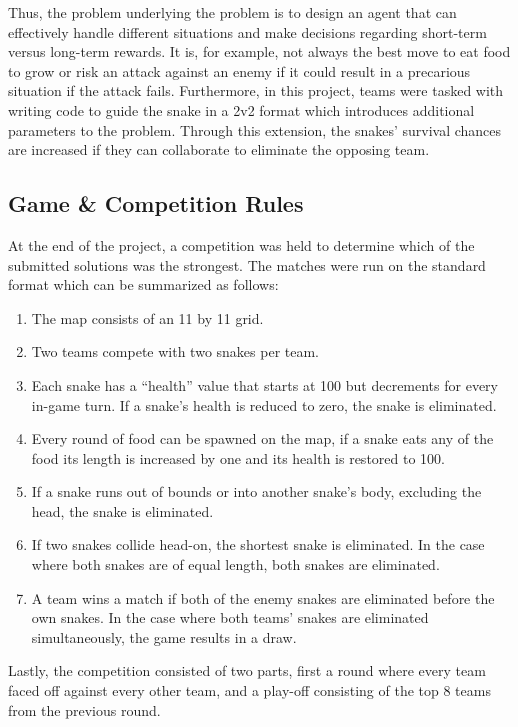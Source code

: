 \documentclass[a4paper,12pt]{article}
\begin{document}
Thus, the problem underlying the problem is to design an agent that can effectively handle different situations and make decisions regarding short-term versus long-term rewards. It is, for example, not always the best move to eat food to grow or risk an attack against an enemy if it could result in a precarious situation if the attack fails. Furthermore, in this project, teams were tasked with writing code to guide the snake in a 2v2 format which introduces additional parameters to the problem. Through this extension, the snakes' survival chances are increased if they can collaborate to eliminate the opposing team.


\subsection{Game \& Competition Rules}
At the end of the project, a competition was held to determine which of the submitted solutions was the strongest. The matches were run on the standard format which can be summarized as follows:

\begin{enumerate}
    \item The map consists of an 11 by 11 grid.
    \item Two teams compete with two snakes per team.
    \item Each snake has a “health” value that starts at 100 but decrements for every in-game turn. If a snake’s health is reduced to zero, the snake is eliminated.
    \item Every round of food can be spawned on the map, if a snake eats any of the food its length is increased by one and its health is restored to 100.
    \item If a snake runs out of bounds or into another snake's body, excluding the head, the snake is eliminated.
    \item If two snakes collide head-on, the shortest snake is eliminated. In the case where both snakes are of equal length, both snakes are eliminated.
    \item A team wins a match if both of the enemy snakes are eliminated before the own snakes. In the case where both teams’ snakes are eliminated simultaneously, the game results in a draw.
\end{enumerate}
Lastly, the competition consisted of two parts, first a round where every team faced off against every other team, and a play-off consisting of the top 8 teams from the previous round.
\end{document}
